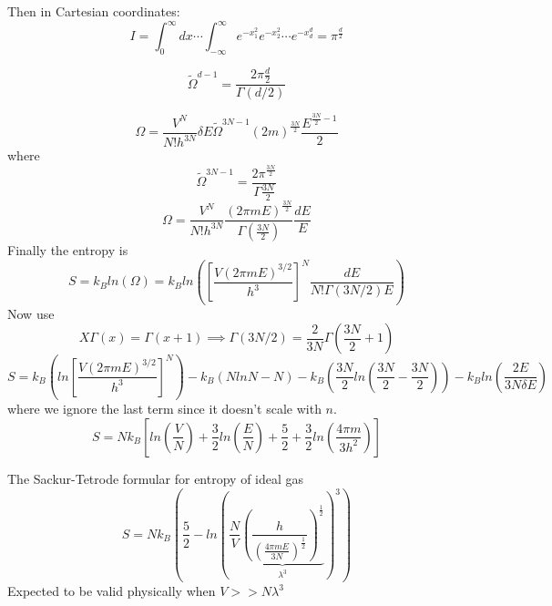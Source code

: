\documentclass[11pt]{book}
\theoremstyle{definition}
\begin{document}
Then in Cartesian coordinates:
\[ I = \int_0^{\infty} dx \cdots \int_{-\infty}^{\infty} e^{-x_1^2}e^{-x_2^2}\cdots e^{-x_d^{d}} = \pi^{\frac{d}{2}} \] 
\begin{shaded*}
\begin{equation}
	\tilde \Omega^{{d-1}} = \frac{2 \pi \frac{d}{2}}{\Gamma(d/2)}
\end{equation}
\end{shaded*}
\[ \Omega =  \frac{V^{N}}{N!h^{3N}} \delta E \tilde \Omega^{3N-1} (2m)^{\frac{3N}{2}} \frac{E^{\frac{3N}{2}-1}}{2} \] 
where
\[ \tilde \Omega^{3N-1} = \frac{2\pi^{\frac{3N}{2}}}{\Gamma{\frac{3N}{2}}}\] 
\[ \Omega = \frac{V^{N}}{N!h^{3N}} \frac{(2 \pi m E )^{\frac{3N}{2}}}{\Gamma(\frac{3N}{2})} \frac{dE}{E}\] 
Finally the entropy is
\[ S = k_B ln(\Omega) = k_B ln(\left[ \frac{V(2 \pi m E)^{3/2}}{h^{3}} \right]^{N} \frac{dE}{N!\Gamma(3N/2)E} ) \] 
Now use \[ X \Gamma(x) = \Gamma(x+1) \implies \Gamma(3N/2) = \frac{2}{3N}\Gamma(\frac{3N}{2}+1) \] 
\[ S = k_B \left( ln\left[ \frac{V(2 \pi m E)^{3/2}}{h^{3}} \right]^{N} \right ) - k_B (NlnN-N) - k_B \left(\frac{3N}{2}ln \left(\frac{3N}{2}-\frac{3N}{2} \right) \right) - k_B ln \left(\frac{2E}{3N \delta E}\right)\] 
where we ignore the last term since it doesn't scale with $ n $.
\[ S = Nk_B \left[ ln \left(\frac{V}{N} \right) + \frac{3}{2} ln \left(\frac{E}{N} \right) + \frac{5}{2} + \frac{3}{2}ln\left( \frac{4\pi m}{3h^2} \right) \right ] \] 
\begin{shaded*}
The Sackur-Tetrode formular for entropy of ideal gas
\begin{equation}
	S = Nk_B \left( \frac{5}{2} - ln\left( \frac{N}{V} \underbrace{\left( \frac{h}{(\frac{4 \pi mE}{3N})^{\frac{1}{2}}} \right)^{\frac{1}{2}}}_{\lambda^{3}}  \right)^3  \right) 
\end{equation}
Expected to be valid physically when $ V >> N\lambda^3 $ 
\end{shaded*}

\pagebreak
\end{document}
